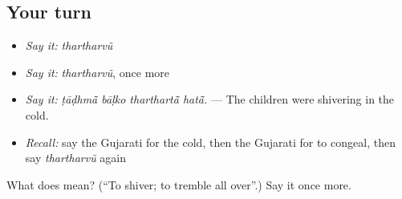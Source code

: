 \subsection*{Your turn}
\begin{itemize}
\raggedright
  \item \emph{Say it:} \emph{thartharvũ}
  \item \emph{Say it:} \emph{thartharvũ}, once more
  \item \emph{Say it:} \emph{ṭāḍhmā̃ bāḷko tharthartā̃ hatā̃.} — The children were shivering in the cold.
  \item \emph{Recall:} say the Gujarati for the cold, then the Gujarati for to congeal, then say \emph{thartharvũ} again
\end{itemize}

\begin{tcolorbox}[breakable,colback=teal!4,colframe=teal!35!black,title={Before you move on}]
What does  mean? (\textquotedblleft{}To shiver; to tremble all over\textquotedblright{}.) Say it once more.
\end{tcolorbox}

